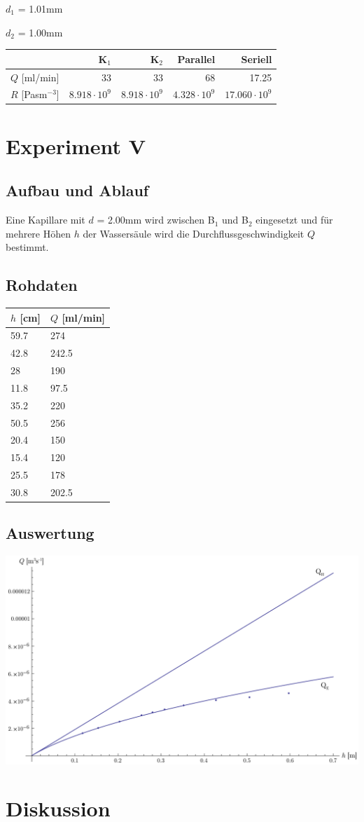\documentclass[12pt,a4paper]{article}
\newcommand{\subscript}[1]{$_{#1}$}
\newcommand{\B}[1]{B\subscript{#1}}
\begin{document}
$d_1$ = 1.01mm

$d_2$ = 1.00mm

\vspace{5pt}
\begin{tabular}{|l|r|r|r|r|}
\hline
&K\subscript{1}&K\subscript{2}&Parallel&Seriell\\
\hline
$Q$ [ml/min]&33&33&68&17.25\\
$R$ [Pasm$^{-3}$]&$8.918\cdot 10^9$&$8.918\cdot 10^9$&$4.328\cdot 10^9$&$17.060\cdot 10^9$\\
\hline
\end{tabular}


\section*{Experiment V}

\subsection*{Aufbau und Ablauf}
Eine Kapillare mit $d$ = 2.00mm wird zwischen \B{1} und \B{2} eingesetzt und f\"ur mehrere H\"ohen $h$ der Wassers\"aule wird die Durchflussgeschwindigkeit $Q$ bestimmt.

\subsection*{Rohdaten}
\begin{tabular}{|l|l|}
\hline
$h$ [cm]&$Q$ [ml/min]\\
\hline
59.7&274\\
42.8&242.5\\
28&190\\
11.8&97.5\\
35.2&220\\
50.5&256\\
20.4&150\\
15.4&120\\
25.5&178\\
30.8&202.5\\
\hline
\end{tabular}

\subsection*{Auswertung}
\begin{center}
\includegraphics[width=15cm]{diagram5.pdf}
\end{center}

\section*{Diskussion}
\end{document}
